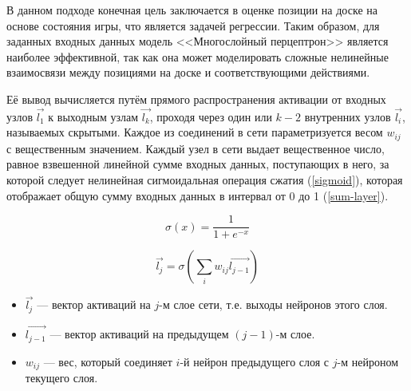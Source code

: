 В данном подходе конечная цель заключается в оценке позиции на доске на основе состояния игры, что является задачей регрессии. Таким образом, для заданных входных данных модель <<Многослойный перцептрон>> \cite{mlp} является наиболее эффективной, так как она может моделировать сложные нелинейные взаимосвязи между позициями на доске и соответствующими действиями.

Её вывод вычисляется путём прямого распространения активации от входных узлов $\vec{l_1}$ к выходным узлам $\vec{l_k}$, проходя через один или $k - 2$ внутренних узлов $\vec{l_i}$, называемых скрытыми. Каждое из соединений в сети параметризуется весом $w_{ij}$ с вещественным значением. Каждый узел в сети выдает вещественное число, равное взвешенной линейной сумме входных данных, поступающих в него, за которой следует нелинейная сигмоидальная операция сжатия (\ref{sigmoid}), которая отображает общую сумму входных данных в интервал от 0 до 1 (\ref{sum-layer}).

\begin{equation}\label{sigmoid}
    \sigma(x) = \frac{1}{1 + e^{-x}}
\end{equation}

\begin{equation}\label{sum-layer}
    \vec{l_j}= \sigma \left(\sum_i w_{ij} \vec{l_{j-1}} \right)
\end{equation}

\begin{itemize}
    \item $\vec{l_j}$ --- вектор активаций на $j$-м слое сети, т.е. выходы нейронов этого слоя.
    \item $\vec{l_{j-1}}$ --- вектор активаций на предыдущем $(j-1)$-м слое.
    \item $w_{ij}$ --- вес, который соединяет $i$-й нейрон предыдущего слоя с $j$-м нейроном текущего слоя.
\end{itemize}
